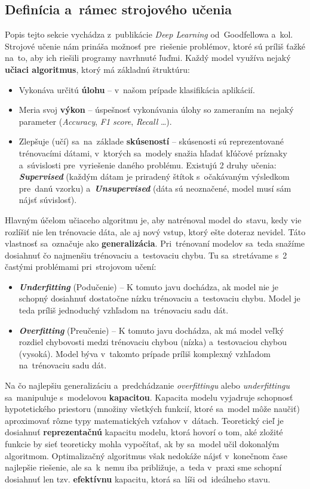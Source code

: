 \subsection{Definícia a~rámec strojového učenia}
Popis tejto sekcie vychádza z~publikácie \textit{Deep Learning} od~Goodfellowa a~kol.~\cite{Goodfellow-et-al-2016} Strojové učenie nám prináša možnosť pre~riešenie problémov, ktoré sú príliš ťažké na~to, aby ich riešili programy navrhnuté ľuďmi. Každý model využíva nejaký \textbf{učiaci algoritmus}, ktorý má základnú štruktúru:
\begin{itemize}
    \item Vykonáva určitú \textbf{úlohu} -- v~našom prípade klasifikácia aplikácií.
    \item Meria svoj \textbf{výkon} -- úspešnosť vykonávania úlohy so zameraním na~nejaký parameter (\textit{Accuracy}, \textit{F1 score}, \textit{Recall} \dots).
    \item Zlepšuje (učí) sa~na~základe \textbf{skúseností} -- skúsenosti sú reprezentované trénovacími dátami, v~ktorých sa~modely snažia hľadať kľúčové príznaky a~súvislosti pre~vyriešenie daného problému. Existujú 2 druhy učenia: \textit{\textbf{Supervised}} (každým dátam je priradený štítok s~očakávaným výsledkom pre~danú vzorku) a~\textit{\textbf{Unsupervised}} (dáta sú neoznačené, model musí sám nájsť súvislosť)\label{th:unsupervised}.
\end{itemize}
\label{training_basics}Hlavným účelom učiaceho algoritmu je, aby natrénoval model do~stavu, kedy vie rozlíšiť nie len trénovacie dáta, ale aj nový vstup, ktorý ešte doteraz nevidel. Táto vlastnosť sa~označuje ako \textbf{generalizácia}\label{th:generalisation}. Pri~trénovaní modelov sa~teda snažíme dosiahnuť čo najmenšiu trénovaciu a~testovaciu chybu. Tu sa~stretávame s~2 častými problémami pri~strojovom učení:
\begin{itemize}
    \item \textbf{\textit{Underfitting}} (Podučenie) -- K tomuto javu dochádza, ak model nie je schopný dosiahnuť dostatočne nízku trénovaciu a~testovaciu chybu. Model je teda príliš jednoduchý vzhľadom na~trénovaciu sadu dát.
    \item \textbf{\textit{Overfitting}}\label{th:overfitting} (Preučenie) -- K tomuto javu dochádza, ak má model veľký rozdiel chybovosti medzi trénovaciu chybou (nízka) a~testovaciou chybou (vysoká). Model býva v~takomto prípade príliš komplexný vzhľadom na~trénovaciu sadu dát.
\end{itemize}
Na čo najlepšiu generalizáciu a~predchádzanie \textit{overfittingu} alebo \textit{underfittingu} sa~manipuluje s~modelovou \textbf{kapacitou}. Kapacita\label{th:capacity} modelu vyjadruje schopnosť hypotetického priestoru (množiny všetkých funkcií, ktoré sa~model môže naučiť) aproximovať rôzne typy matematických vzťahov v~dátach. Teoretický cieľ je dosiahnuť \textbf{reprezentačnú} kapacitu modelu, ktorá hovorí o tom, aké zložité funkcie by sieť teoreticky mohla vypočítať, ak by sa~model učil dokonalým algoritmom. Optimalizačný algoritmus však nedokáže nájsť v~konečnom čase najlepšie riešenie, ale sa~k~nemu iba približuje, a~teda v~praxi sme schopní dosiahnuť len tzv. \textbf{efektívnu} kapacitu, ktorá sa~líši od~ideálneho stavu.

